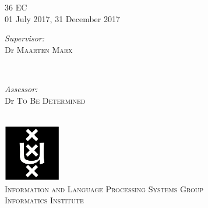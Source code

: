 \begin{titlepage}
36 EC\\ %
01 July 2017, 31 December 2017 \\[1cm]%

\begin{minipage}[t]{0.4\textwidth}
\begin{flushleft} \large
\emph{Supervisor:} \\
Dr \textsc{Maarten Marx} %
\end{flushleft}
\end{minipage}
~
\begin{minipage}[t]{0.4\textwidth}
\begin{flushright} \large
\emph{Assessor:} \\
Dr \textsc{To Be Determined}\\
\end{flushright}
\end{minipage}\\[2cm]


\includegraphics[width=2.5cm]{logo-uva}\\ %
\textsc{\large Information and Language Processing Systems Group\\ Informatics Institute}\\[1.0cm] %
 

\vfill %

\end{titlepage}
\restoregeometry